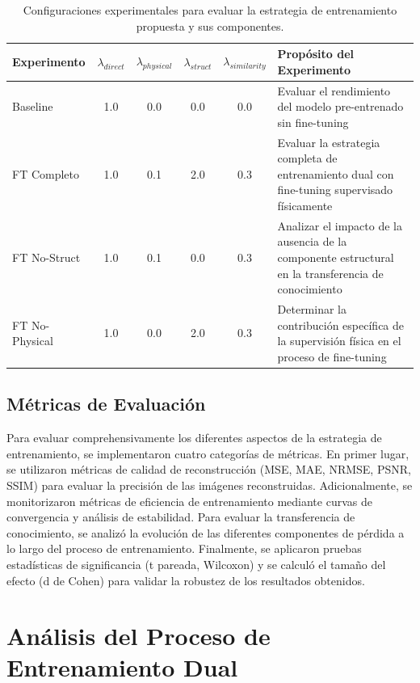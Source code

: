 \begin{table}[htbp]
    \centering
    \begin{tabular}{lccccp{5cm}}
    \hline
    \textbf{Experimento} & $\lambda_{direct}$ & $\lambda_{physical}$ & $\lambda_{struct}$ & $\lambda_{similarity}$ & \textbf{Propósito del Experimento} \\
    \hline
    Baseline & 1.0 & 0.0 & 0.0 & 0.0 & Evaluar el rendimiento del modelo pre-entrenado sin fine-tuning \\
    \hline
    FT Completo & 1.0 & 0.1 & 2.0 & 0.3 & Evaluar la estrategia completa de entrenamiento dual con fine-tuning supervisado físicamente \\
    \hline
    FT No-Struct & 1.0 & 0.1 & 0.0 & 0.3 & Analizar el impacto de la ausencia de la componente estructural en la transferencia de conocimiento \\
    \hline
    FT No-Physical & 1.0 & 0.0 & 2.0 & 0.3 & Determinar la contribución específica de la supervisión física en el proceso de fine-tuning \\
    \hline
    \end{tabular}
    \caption{Configuraciones experimentales para evaluar la estrategia de entrenamiento propuesta y sus componentes.}
    \label{tab:experiments}
\end{table}

\subsection{Métricas de Evaluación}

Para evaluar comprehensivamente los diferentes aspectos de la estrategia de entrenamiento, se implementaron cuatro categorías de métricas. En primer lugar, se utilizaron métricas de calidad de reconstrucción (MSE, MAE, NRMSE, PSNR, SSIM) para evaluar la precisión de las imágenes reconstruidas. Adicionalmente, se monitorizaron métricas de eficiencia de entrenamiento mediante curvas de convergencia y análisis de estabilidad. Para evaluar la transferencia de conocimiento, se analizó la evolución de las diferentes componentes de pérdida a lo largo del proceso de entrenamiento. Finalmente, se aplicaron pruebas estadísticas de significancia (t pareada, Wilcoxon) y se calculó el tamaño del efecto (d de Cohen) para validar la robustez de los resultados obtenidos.

\section{Análisis del Proceso de Entrenamiento Dual}

